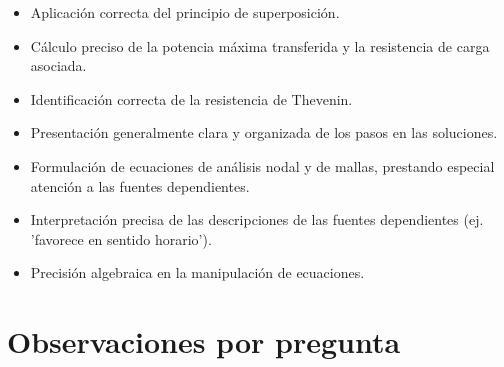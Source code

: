 \documentclass[11pt,a4paper]{article}
\begin{document}
\vspace{4pt}
\begin{minipage}[t]{0.48\linewidth}
  \begin{tcolorbox}[cajaFortaleza, title={Fortalezas}]
\begin{itemize}[leftmargin=1.5em, itemsep=2pt]
  \item Aplicación correcta del principio de superposición.
  \item Cálculo preciso de la potencia máxima transferida y la resistencia de carga asociada.
  \item Identificación correcta de la resistencia de Thevenin.
  \item Presentación generalmente clara y organizada de los pasos en las soluciones.
\end{itemize}
  \end{tcolorbox}
\end{minipage}
\hfill
\begin{minipage}[t]{0.48\linewidth}
  \begin{tcolorbox}[cajaMejora, title={Areas de mejora}]
\begin{itemize}[leftmargin=1.5em, itemsep=2pt]
  \item Formulación de ecuaciones de análisis nodal y de mallas, prestando especial atención a las fuentes dependientes.
  \item Interpretación precisa de las descripciones de las fuentes dependientes (ej. 'favorece en sentido horario').
  \item Precisión algebraica en la manipulación de ecuaciones.
\end{itemize}
  \end{tcolorbox}
\end{minipage}

\section*{Observaciones por pregunta}
\end{document}
